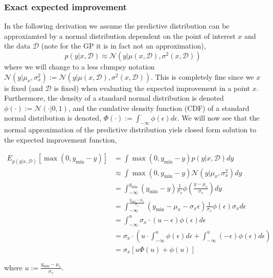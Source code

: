 \subsubsection{Exact expected improvement} \label{ExactEI} 
In the following derivation we assume the
predictive distribution can be approxiamted by a normal distribution dependent on the point of
interest $x$ and the data $\mathcal{D}$ (note for the GP it is in fact not an approximation), 
$$p(y|x,\mathcal{D}) \approx \mathcal{N}(y|\mu(x,\mathcal{D}), \sigma^2(x,\mathcal{D}))$$ where we
will change to a less clumpsy notation $\mathcal{N}(y|\mu_x,
\sigma^2_x):=\mathcal{N}(y|\mu(x,\mathcal{D}), \sigma^2(x,\mathcal{D}))$. This is completely fine
since we $x$ is fixed (and $\mathcal{D}$ is fixed) when evaluating the expected improvement in a point
$x$. %
Furthermore, the density of
a standard normal distribution is denoted $\phi(\cdot):=\mathcal{N}(\cdot | 0,1)$, and the cumlative
density function (CDF) of a standard normal distribution is denoted, $\Phi(\cdot) :=
\int_{-\infty}^{\cdot} \phi(\epsilon)d\epsilon$. We will now see that the normal approximation
of the predictive distribution yiels closed form solution to the expected improvement function, 

\begin{align*}
    E_{p(y|x,\mathcal{D})}[\max(0,y_{\min}-y)] &= \int \max(0,y_{\min}-y) p(y|x,\mathcal{D}) dy\\
    &\approx \int \max(0,y_{\min}-y) \mathcal{N}(y|\mu_x, \sigma_x^2) dy\\
    &= \int_{-\infty}^{y_{\min}} (y_{\min}-y) \frac{1}{\sigma_x}\phi\left(\frac{y-\mu_x}{\sigma_x}\right) dy\\
    &= \int_{-\infty}^{\frac{y_{\min}-\mu_x}{\sigma_x}} (y_{\min}-\mu_x-\sigma_x\epsilon) \frac{1}{\sigma_x}\phi\left(\epsilon\right) \sigma_x d\epsilon\\
    &= \int_{-\infty}^u \sigma_x \cdot (u-\epsilon) \phi(\epsilon) d\epsilon\\
    &=  \sigma_x \cdot \left( u\cdot \int_{-\infty}^u \phi(\epsilon) d\epsilon +\int_{-\infty}^u (-\epsilon)  \phi(\epsilon) d\epsilon \right) \\
    &= \sigma_x [u\Phi(u)+ \phi(u)]
\end{align*}

where $u:=\frac{y_{\min}-\mu_x}{\sigma_x}$. 

